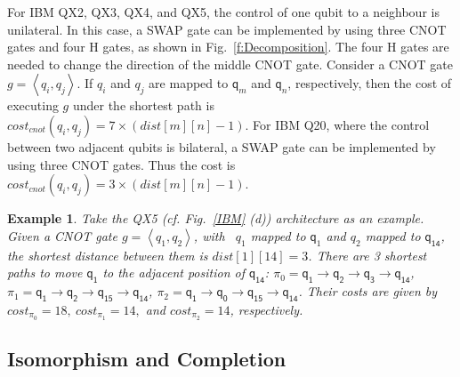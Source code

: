 \documentclass[journal]{IEEEtran}
\newtheorem{example}{Example}
\begin{document}
For IBM QX2, QX3, QX4, and QX5, the control of one qubit to a neighbour is unilateral. In this case, 
a SWAP gate can be implemented by using three CNOT gates and four H gates, as shown in Fig.~\ref{f:Decomposition}. The four H gates are needed to change the direction of the middle CNOT gate. 
Consider a CNOT gate $g=\left \langle  \textit{q}_\textit{i},\textit{q}_\textit{j} \right \rangle $. If $q_i$ and $q_j$  are mapped to $\textsf{q}_{m}$ and $\textsf{q}_{n}$, respectively, then the cost of executing $g$ under the shortest path is $cost_{cnot}(\textit{q}_\textit{i},\textit{q}_\textit{j})=7 \times( dist[m][n]-1)$. For IBM Q20, where the control between two adjacent qubits is bilateral, a SWAP gate can be implemented by using three CNOT gates. Thus the cost  is $cost_{cnot}(\textit{q}_\textit{i},\textit{q}_\textit{j})=3 \times( dist[m][n]-1)$. 
\begin{example}
	Take the QX5 (cf. Fig.~\ref{IBM} (d)) architecture  as an example. Given a CNOT gate $g=\left \langle  \textit{q}_\textit{1}, \textit{q}_\textit{2} \right \rangle $, with \ $\textit{q}_\textit{1}$ mapped to $\textsf{q}_{1}$ and $\textit{q}_\textit{2}$ mapped to $\textsf{q}_{\textsf{14}}$, the shortest distance between them  is $dist[1][14]=3$. There are 3 shortest paths to move $\textsf{q}_{\textsf{1}}$ to the adjacent position of 
$\textsf{q}_{\textsf{14}}$:
$\pi_{0}={\textsf{q}_{\textsf{1}}\rightarrow \textsf{q}_{\textsf{2}} \rightarrow \textsf{q}_{\textsf{3}} \rightarrow \textsf{q}_{\textsf{14}}}$,
$\pi_{1}={\textsf{q}_{\textsf{1}}\rightarrow \textsf{q}_{\textsf{2}} \rightarrow \textsf{q}_{\textsf{15}} \rightarrow \textsf{q}_{\textsf{14}}}$,
$\pi_{2}={\textsf{q}_{\textsf{1}}\rightarrow \textsf{q}_{\textsf{0}} \rightarrow \textsf{q}_{\textsf{15}} \rightarrow \textsf{q}_{\textsf{14}}}$.
Their costs are given by 
$cost_{\pi_{0}}=18,\ cost_{\pi_{1}}=14,$ and $ cost_{\pi_{2}}=14$, respectively.
\end{example}



\subsection{Isomorphism and Completion}
\end{document}
